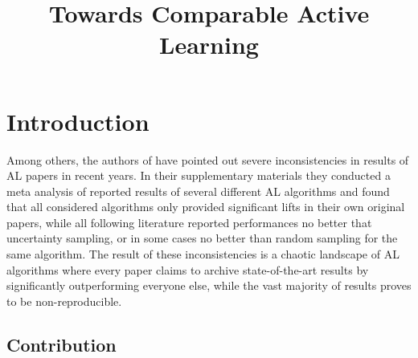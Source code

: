 \documentclass[]{article}
\title{Towards Comparable Active Learning}
\begin{document}
\maketitle

\section{Introduction}
Among others, the authors of \cite{zhou2021towards} have pointed out severe inconsistencies in results of AL papers in recent years. 
In their supplementary materials they conducted a meta analysis of reported results of several different AL algorithms and found that all considered algorithms only provided significant lifts in their own original papers, while all following literature reported performances no better that uncertainty sampling, or in some cases no better than random sampling for the same algorithm.
The result of these inconsistencies is a chaotic landscape of AL algorithms where every paper claims to archive state-of-the-art results by significantly outperforming everyone else, while the vast majority of results proves to be non-reproducible.

\subsection{Contribution}

\end{document}

